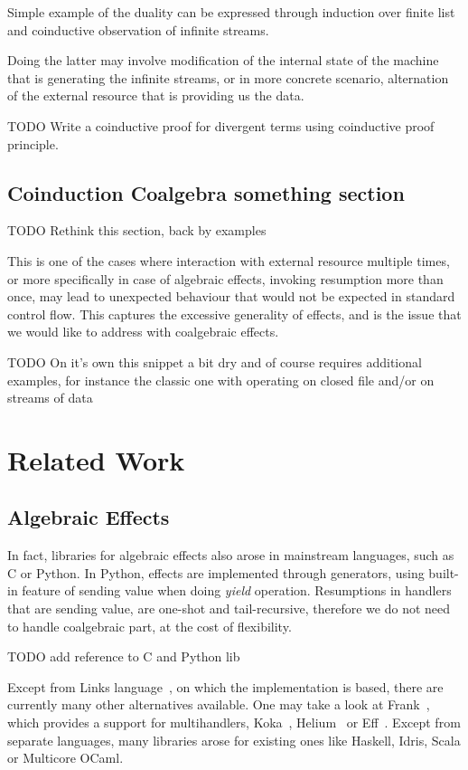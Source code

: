 \documentclass[declaration,shortabstract]{iithesis}
\theoremstyle{definition} \newtheorem{definition}{Definition}[chapter]
\theoremstyle{remark} \newtheorem{remark}[definition]{Observation}
\theoremstyle{plain} \newtheorem{theorem}[definition]{Theorem}
\theoremstyle{plain} \newtheorem{lemma}[definition]{Lemma}
\begin{document}
    Simple example of the duality can be expressed through induction over finite
    list and coinductive observation of infinite streams.

    Doing the latter may involve modification of the internal state of the
    machine that is generating the infinite streams, or in more concrete
    scenario, alternation of the external resource that is providing us the data.

    TODO Write a coinductive proof for divergent terms using coinductive proof
    principle.

\subsection{Coinduction Coalgebra something section}

    TODO Rethink this section, back by examples

    This is one of the cases where interaction with external resource multiple
    times, or more specifically in case of algebraic effects, invoking resumption more
    than once, may lead to unexpected behaviour that would not be expected in standard
    control flow. This captures the excessive generality of effects, and is the
    issue that we would like to address with coalgebraic effects.

    TODO On it's own this snippet a bit dry and of course requires additional examples,
    for instance the classic one with operating on closed file and/or on
    streams of data


\section{Related Work}
    \subsection{Algebraic Effects}

    In fact, libraries for algebraic effects also arose in mainstream languages,
    such as C or Python. In Python, effects are implemented through generators,
    using built-in feature of sending value when doing \textit{yield} operation.
    Resumptions in handlers that are sending value, are one-shot and tail-recursive,
    therefore we do not need to handle coalgebraic part, at the cost of flexibility.

    TODO add reference to C and Python lib

    Except from Links language~\cite{handlers-cps}, on which the implementation
    is based, there are currently many other alternatives available. One may take
    a look at Frank~\cite{frank}, which provides a support for multihandlers,
    Koka~\cite{leijen-koka}, Helium~\cite{helium} or Eff~\cite{eff}. Except from
    separate languages, many libraries arose for existing ones like Haskell,
    Idris, Scala or Multicore OCaml.
\end{document}
